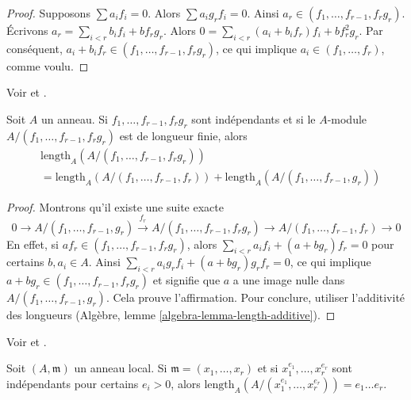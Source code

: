 \begin{proof}
Supposons $\sum a_if_i = 0$. Alors $\sum a_ig_rf_i = 0$. Ainsi $a_r \in (f_1, \ldots, f_{r - 1}, f_rg_r)$. Écrivons $a_r = \sum_{i < r} b_i f_i + b f_rg_r$. Alors $0 = \sum_{i < r} (a_i + b_if_r)f_i + bf_r^2g_r$. Par conséquent, $a_i + b_i f_r \in (f_1, \ldots, f_{r - 1}, f_rg_r)$, ce qui implique $a_i \in (f_1, \ldots, f_r)$, comme voulu.

\end{proof}

\begin{lemma}
\label{lemma-2}
\begin{reference}
Voir \cite{Lech-inequalities} et \cite[Lemma 2 page 300]{MatCA}.
\end{reference}
Soit $A$ un anneau. Si $f_1, \ldots, f_{r - 1}, f_rg_r$ sont indépendants et si le $A$-module $A/(f_1, \ldots, f_{r - 1}, f_rg_r)$ est de longueur finie, alors
\begin{align*}
& \text{length}_A(A/(f_1, \ldots, f_{r - 1}, f_rg_r)) \\
& =
\text{length}_A(A/(f_1, \ldots, f_{r - 1}, f_r)) +
\text{length}_A(A/(f_1, \ldots, f_{r - 1}, g_r))
\end{align*}
\end{lemma}

\begin{proof}
Montrons qu'il existe une suite exacte
$$
0 \to
A/(f_1, \ldots, f_{r - 1}, g_r) \xrightarrow{f_r}
A/(f_1, \ldots, f_{r - 1}, f_rg_r) \to
A/(f_1, \ldots, f_{r - 1}, f_r) \to 0
$$
En effet, si $a f_r \in (f_1, \ldots, f_{r - 1}, f_rg_r)$, alors $\sum_{i < r} a_i f_i + (a + bg_r)f_r = 0$ pour certains $b, a_i \in A$. Ainsi $\sum_{i < r} a_i g_r f_i + (a + bg_r)g_rf_r = 0$, ce qui implique $a + bg_r \in (f_1, \ldots, f_{r - 1}, f_rg_r)$ et signifie que $a$ a une image nulle dans $A/(f_1, \ldots, f_{r - 1}, g_r)$. Cela prouve l'affirmation. Pour conclure, utiliser l'additivité des longueurs (Algèbre, lemme \ref{algebra-lemma-length-additive}).
\end{proof}

\begin{lemma}
\label{lemma-3}
\begin{reference}
Voir \cite{Lech-inequalities} et \cite[Lemma 3 page 300]{MatCA}.
\end{reference}
Soit $(A, \mathfrak m)$ un anneau local. Si $\mathfrak m = (x_1, \ldots, x_r)$ et si $x_1^{e_1}, \ldots, x_r^{e_r}$ sont indépendants pour certains $e_i > 0$, alors $\text{length}_A(A/(x_1^{e_1}, \ldots, x_r^{e_r})) = e_1\ldots e_r$.
\end{lemma}

